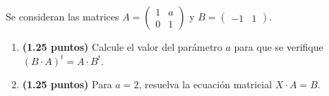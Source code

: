 
Se consideran las matrices $A=\begin{pmatrix}1&a\\0&1\end{pmatrix}$ y $B=\begin{pmatrix}-1&1\end{pmatrix}$.
\begin{enumerate}[label=\alph*)]
\item \textbf{(1.25 puntos)} Calcule el valor del parámetro $a$ para que se verifique $(B\cdot A)^t=A\cdot B^t$.
\item \textbf{(1.25 puntos)} Para $a=2$, resuelva la ecuación matricial $X\cdot A=B$.
\end{enumerate}
